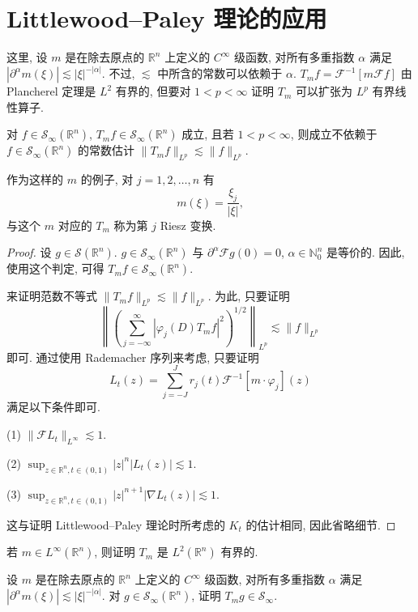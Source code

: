 
\section{Littlewood--Paley 理论的应用}\label{sec:6.2}




这里, 设 $m$ 是在除去原点的 $\mathbb{R}^{n}$ 上定义的 $C^{\infty}$ 级函数, 对所有多重指数 $\alpha$ 满足 $|\partial^{\alpha}m(\xi)| \lesssim |\xi|^{-|\alpha|}$. 不过, $\lesssim$ 中所含的常数可以依赖于 $\alpha$. $T_{m}f = \mathcal{F}^{-1}[m\mathcal{F}f]$ 由 Plancherel 定理是 $L^{2}$ 有界的, 但要对 $1 < p < \infty$ 证明 $T_{m}$ 可以扩张为 $L^{p}$ 有界线性算子.

\begin{theorem}\label{thm:6.2}
对 $f \in \mathcal{S}_{\infty}(\mathbb{R}^{n})$, $T_{m}f \in \mathcal{S}_{\infty}(\mathbb{R}^{n})$ 成立, 且若 $1 < p < \infty$, 则成立不依赖于 $f \in \mathcal{S}_{\infty}(\mathbb{R}^{n})$ 的常数估计 $\|T_{m}f\|_{L^{p}} \lesssim \|f\|_{L^{p}}$.
\end{theorem}

作为这样的 $m$ 的例子, 对 $j = 1, 2, \ldots, n$ 有
\[
m(\xi) = \frac{\xi_{j}}{|\xi|},
\]
与这个 $m$ 对应的 $T_{m}$ 称为第 $j$ Riesz 变换.

\begin{proof}
设 $g \in \mathcal{S}(\mathbb{R}^{n})$. $g \in \mathcal{S}_{\infty}(\mathbb{R}^{n})$ 与 $\partial^{\alpha}\mathcal{F}g(0) = 0$, $\alpha \in \mathbb{N}_{0}^{n}$ 是等价的. 因此, 使用这个判定, 可得 $T_{m}f \in \mathcal{S}_{\infty}(\mathbb{R}^{n})$.

来证明范数不等式 $\|T_{m}f\|_{L^{p}} \lesssim \|f\|_{L^{p}}$. 为此, 只要证明
\[
\left\|\left(\sum_{j=-\infty}^{\infty}|\varphi_{j}(D)T_{m}f|^{2}\right)^{1/2}\right\|_{L^{p}} \lesssim \|f\|_{L^{p}}
\]
即可. 通过使用 Rademacher 序列来考虑, 只要证明
\[
L_{t}(z) = \sum_{j=-J}^{J}r_{j}(t)\mathcal{F}^{-1}[m\cdot\varphi_{j}](z)
\]
满足以下条件即可.

(1) $\|\mathcal{F}L_{t}\|_{L^{\infty}} \lesssim 1$.

(2) $\sup_{z \in \mathbb{R}^{n}, t \in (0,1)}|z|^{n}|L_{t}(z)| \lesssim 1$.

(3) $\sup_{z \in \mathbb{R}^{n}, t \in (0,1)}|z|^{n+1}|\nabla L_{t}(z)| \lesssim 1$.

这与证明 Littlewood--Paley 理论时所考虑的 $K_{t}$ 的估计相同, 因此省略细节.
\end{proof}

\begin{exercise}\label{exer:6.2}
若 $m \in L^{\infty}(\mathbb{R}^{n})$, 则证明 $T_{m}$ 是 $L^{2}(\mathbb{R}^{n})$ 有界的.
\end{exercise}

\begin{exercise}\label{exer:6.3}
设 $m$ 是在除去原点的 $\mathbb{R}^{n}$ 上定义的 $C^{\infty}$ 级函数, 对所有多重指数 $\alpha$ 满足 $|\partial^{\alpha}m(\xi)| \lesssim |\xi|^{-|\alpha|}$. 对 $g \in \mathcal{S}_{\infty}(\mathbb{R}^{n})$, 证明 $T_{m}g \in \mathcal{S}_{\infty}$.
\end{exercise}
